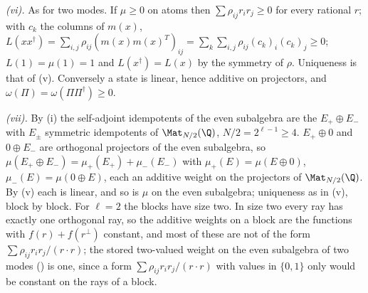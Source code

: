 \emph{(vi).} As for two modes. If $\mu \ge 0$ on atoms then $\sum\rho_{ij}r_{i}r_{j} \ge 0$ for every rational $r$; with $c_{k}$ the columns of $m(x)$, $L(xx^{\dagger}) = \sum_{i,j}\rho_{ij}(m(x)m(x)^{T})_{ij} = \sum_{k}\sum_{i,j}\rho_{ij}(c_{k})_{i}(c_{k})_{j} \ge 0$; $L(1) = \mu(1) = 1$ and $L(x^{\dagger}) = L(x)$ by the symmetry of $\rho$. Uniqueness is that of (v). Conversely a state is linear, hence additive on projectors, and $\omega(\Pi) = \omega(\Pi\Pi^{\dagger}) \ge 0$.

\emph{(vii).} By (i) the self-adjoint idempotents of the even subalgebra are the $E_{+} \oplus E_{-}$ with $E_{\pm}$ symmetric idempotents of $\Mat_{N/2}(\Q)$, $N/2 = 2^{\ell-1} \ge 4$. $E_{+} \oplus 0$ and $0 \oplus E_{-}$ are orthogonal projectors of the even subalgebra, so $\mu(E_{+} \oplus E_{-}) = \mu_{+}(E_{+}) + \mu_{-}(E_{-})$ with $\mu_{+}(E) = \mu(E \oplus 0)$, $\mu_{-}(E) = \mu(0 \oplus E)$, each an additive weight on the projectors of $\Mat_{N/2}(\Q)$. By (v) each is linear, and so is $\mu$ on the even subalgebra; uniqueness as in (v), block by block. For $\ell = 2$ the blocks have size two. In size two every ray has exactly one orthogonal ray, so the additive weights on a block are the functions with $f(r) + f(r^{\perp})$ constant, and most of these are not of the form $\sum\rho_{ij}r_{i}r_{j}/(r \cdot r)$; the stored two-valued weight on the even subalgebra of two modes () is one, since a form $\sum\rho_{ij}r_{i}r_{j}/(r \cdot r)$ with values in $\{0, 1\}$ only would be constant on the rays of a block.
